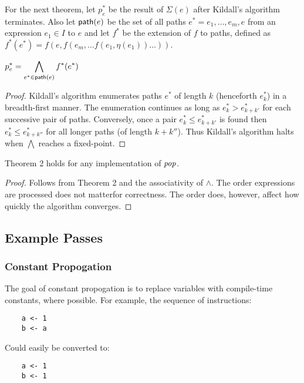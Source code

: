 \documentclass{article}
\begin{document}
For the next theorem, let $p_e^*$ be the result of $\Sigma(e)$ after Kildall's algorithm terminates.
Also let $\mathsf{path}(e)$ be the set of all paths $e^* = e_1, \ldots, e_m, e$ from an expression $e_1 \in I$ to $e$ and let $f^*$ be the extension of $f$ to paths, defined as $f^*(e^*) = f(e, f(e_m, \ldots f(e_1, \eta(e_1)) \ldots))$.
\begin{t2}
  $\displaystyle p_e^* = \bigwedge_{e^* \in \mathsf{path}(e)} f^*(e^*)$
\end{t2}
\begin{proof}
Kildall's algorithm enumerates paths $e^*$ of length $k$ (henceforth $e^*_k$) in a breadth-first manner.
The enumeration continues as long as $e^*_k > e^*_{k+k'}$ for each successive pair of paths.
Conversely, once a pair $e^*_k \leq e^*_{k+k'}$ is found then $e^*_k \leq e^*_{k+k''}$ for all longer paths (of length $k + k''$).
Thus Kildall's algorithm halts when $\bigwedge$ reaches a fixed-point.
\end{proof}

\begin{c1}
Theorem 2 holds for any implementation of $\emph{pop}$.
\end{c1}
\begin{proof}
Follows from Theorem 2 and the associativity of $\wedge$.
The order expressions are processed does not matter\textemdash for correctness.
The order does, however, affect how quickly the algorithm converges.
\end{proof}


\subsection*{Example Passes}
\label{examples}

\subsubsection*{Constant Propogation}
The goal of constant propogation is to replace variables with compile-time constants, where possible.
For example, the sequence of instructions:

\begin{lstlisting}
    a <- 1
    b <- a
\end{lstlisting}

Could easily be converted to:

\begin{lstlisting}
    a <- 1
    b <- 1
\end{lstlisting}
\end{document}
